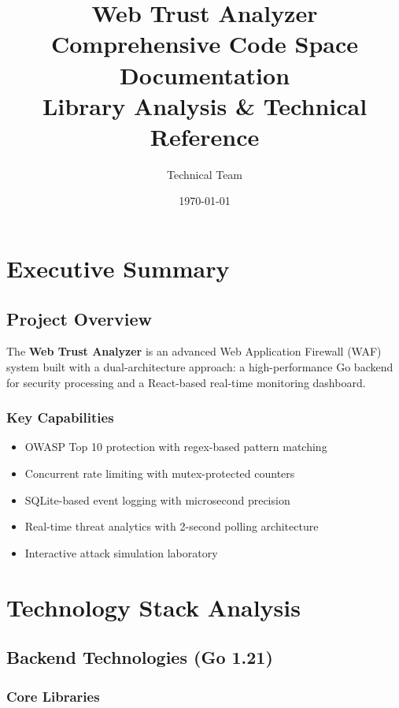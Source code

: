 \documentclass[11pt,a4paper]{report}
\title{\textbf{Web Trust Analyzer}\\
\Large{Comprehensive Code Space Documentation}\\
\large{Library Analysis \& Technical Reference}}
\author{Technical Team}
\date{\today}
\begin{document}
\maketitle
\tableofcontents
\newpage

\chapter{Executive Summary}

\section{Project Overview}
The \textbf{Web Trust Analyzer} is an advanced Web Application Firewall (WAF) system built with a dual-architecture approach: a high-performance Go backend for security processing and a React-based real-time monitoring dashboard.

\subsection{Key Capabilities}
\begin{itemize}
    \item OWASP Top 10 protection with regex-based pattern matching
    \item Concurrent rate limiting with mutex-protected counters
    \item SQLite-based event logging with microsecond precision
    \item Real-time threat analytics with 2-second polling architecture
    \item Interactive attack simulation laboratory
\end{itemize}

\chapter{Technology Stack Analysis}

\section{Backend Technologies (Go 1.21)}

\subsection{Core Libraries}
\end{document}
